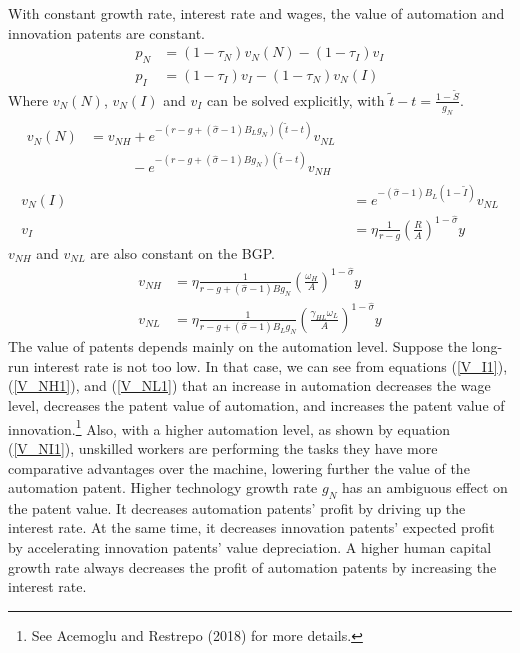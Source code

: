 \documentclass[12pt]{article}
\begin{document}
With constant growth rate, interest rate and wages, the value of automation and innovation patents are constant. 
\begin{align*}
p_N &= (1-\tau_N)v_N(N)-(1-\tau_I)v_I\\
p_I &= (1-\tau_I)v_I-(1-\tau_N)v_N(I) 
\end{align*}
Where $v_N(N)$, $v_N(I)$ and $v_I$ can be solved explicitly, with $\tilde{t}-t =\frac{1-\tilde{S}}{g_N}$.
\begin{align}
\label{V_NN1}
\begin{split}
v_N(N) &= v_{NH}+e^{-(r-g+(\hat{\sigma}-1)B_Lg_N)(\tilde{t}-t)}v_{NL} \\
&\quad \quad \quad -e^{-(r-g+(\hat{\sigma}-1)Bg_N)(\tilde{t}-t)}v_{NH} 
\end{split} \\
\label{V_NI1} 
v_N(I) &=e^{-(\hat{\sigma}-1)B_L(1-\tilde{I})}v_{NL} \\
\label{V_I1}
v_I &= \eta\frac{1}{r-g}(\frac{R}{A})^{1-\hat{\sigma}}y
\end{align}
$v_{NH}$ and $v_{NL}$ are also constant on the BGP. 
\begin{align}
\label{V_NH1} 
v_{NH} &= \eta\frac{1}{r-g+(\hat{\sigma}-1)Bg_N}(\frac{\omega_H}{A})^{1-\hat{\sigma}}y \\
\label{V_NL1} 
v_{NL} &=\eta \frac{1}{r-g+(\hat{\sigma}-1)B_Lg_N}(\frac{\gamma_{HL}\omega_L}{A})^{1-\hat{\sigma}}y 
\end{align}
The value of patents depends mainly on the automation level. Suppose the long-run interest rate is not too low. In that case, we can see from equations (\ref{V_I1}), (\ref{V_NH1}), and (\ref{V_NL1}) that an increase in automation decreases the wage level, decreases the patent value of automation, and increases the patent value of innovation.\footnote{See Acemoglu and Restrepo (2018)\nocite{AcemogluRestrepo2018} for more details.} Also, with a higher automation level, as shown by equation (\ref{V_NI1}), unskilled workers are performing the tasks they have more comparative advantages over the machine, lowering further the value of the automation patent. Higher technology growth rate $g_N$ has an ambiguous effect on the patent value. It decreases automation patents' profit by driving up the interest rate. At the same time, it decreases innovation patents' expected profit by accelerating innovation patents' value depreciation. A higher human capital growth rate always decreases the profit of automation patents by increasing the interest rate. 
\end{document}
